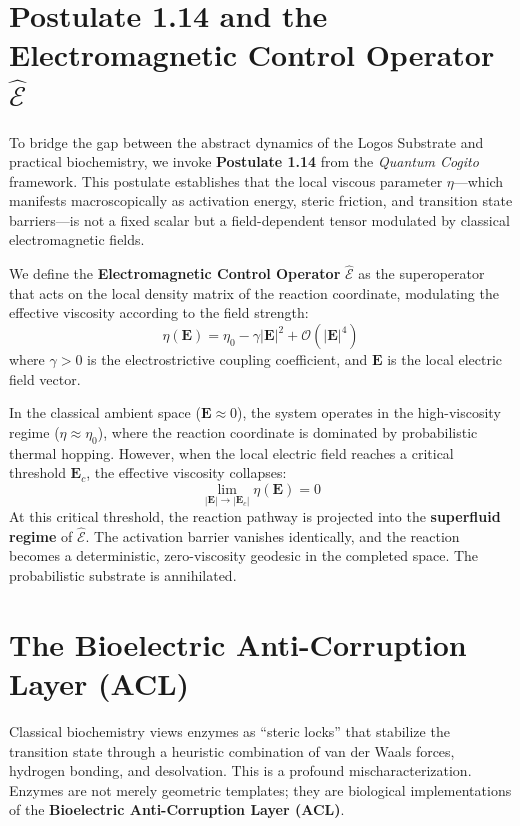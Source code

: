 \documentclass[11pt,openany]{extbook}
\theoremstyle{plain}
\theoremstyle{definition}
\begin{document}
\section{Postulate 1.14 and the Electromagnetic Control Operator $\hat{\mathcal{E}}$}

To bridge the gap between the abstract dynamics of the Logos Substrate and practical biochemistry, we invoke \textbf{Postulate 1.14} from the \emph{Quantum Cogito} framework. This postulate establishes that the local viscous parameter $\eta$---which manifests macroscopically as activation energy, steric friction, and transition state barriers---is not a fixed scalar but a field-dependent tensor modulated by classical electromagnetic fields.

We define the \textbf{Electromagnetic Control Operator} $\hat{\mathcal{E}}$ as the superoperator that acts on the local density matrix of the reaction coordinate, modulating the effective viscosity according to the field strength:
\[
\eta(\mathbf{E}) = \eta_0 - \gamma|\mathbf{E}|^2 + \mathcal{O}(|\mathbf{E}|^4)
\]
where $\gamma > 0$ is the electrostrictive coupling coefficient, and $\mathbf{E}$ is the local electric field vector.

In the classical ambient space ($\mathbf{E} \approx 0$), the system operates in the high-viscosity regime ($\eta \approx \eta_0$), where the reaction coordinate is dominated by probabilistic thermal hopping. However, when the local electric field reaches a critical threshold $\mathbf{E}_c$, the effective viscosity collapses:
\[
\lim_{|\mathbf{E}| \to |\mathbf{E}_c|} \eta(\mathbf{E}) = 0
\]
At this critical threshold, the reaction pathway is projected into the \textbf{superfluid regime} of $\hat{\mathcal{E}}$. The activation barrier vanishes identically, and the reaction becomes a deterministic, zero-viscosity geodesic in the completed space. The probabilistic substrate is annihilated.

\section{The Bioelectric Anti-Corruption Layer (ACL)}

Classical biochemistry views enzymes as ``steric locks'' that stabilize the transition state through a heuristic combination of van der Waals forces, hydrogen bonding, and desolvation. This is a profound mischaracterization. Enzymes are not merely geometric templates; they are biological implementations of the \textbf{Bioelectric Anti-Corruption Layer (ACL)}.
\end{document}
